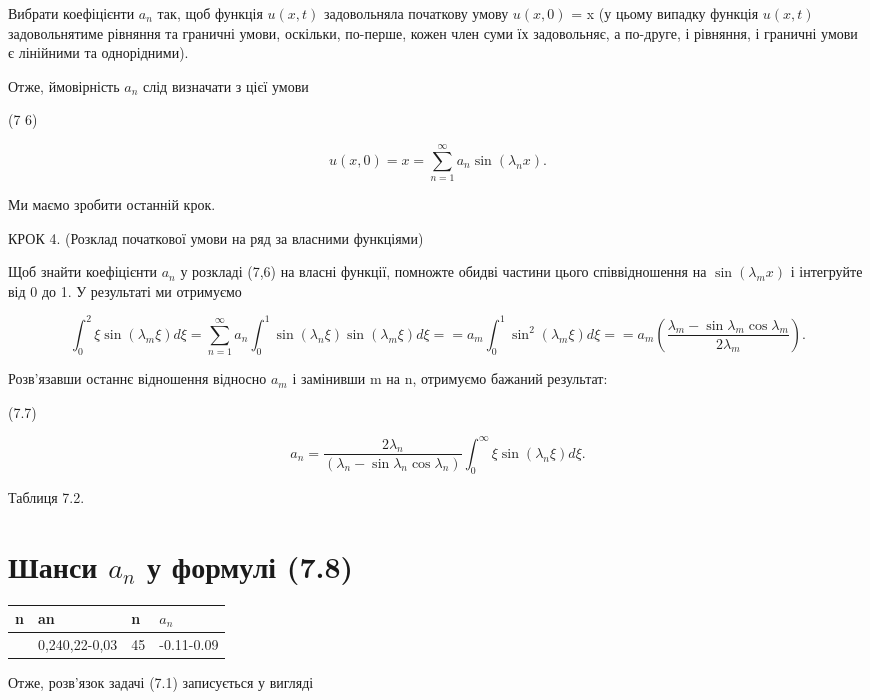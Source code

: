 \documentclass[
  ukrainian,
]{article}
\newcounter{none} %
\begin{document}
Вибрати коефіцієнти \(a_n\) так, щоб функція \(u(x, t)\) задовольняла
початкову умову \(u(x, 0)\) = x (у цьому випадку функція \(u(x, t)\)
задовольнятиме рівняння та граничні умови, оскільки, по-перше, кожен
член суми їх задовольняє, а по-друге, і рівняння, і граничні умови є
лінійними та однорідними).

Отже, ймовірність \(a_n\) слід визначати з цієї умови

(7 6)

\[
u(x, 0) = x = \sum_{n=1}^{\infty} a_n \sin(\lambda_n x).
\]

Ми маємо зробити останній крок.

КРОК 4. (Розклад початкової умови на ряд за власними функціями)

Щоб знайти коефіцієнти \(a_n\) у розкладі (7,6) на власні функції,
помножте обидві частини цього співвідношення на \(\sin(\lambda_m x)\) і
інтегруйте від 0 до 1. У результаті ми отримуємо

\[
\int_{0}^{2} \xi \sin(\lambda_{m} \xi) d\xi = \sum_{n=1}^{\infty} a_{n} \int_{0}^{1} \sin(\lambda_{n} \xi) \sin(\lambda_{m} \xi) d\xi =
= a_{m} \int_{0}^{1} \sin^{2}(\lambda_{m} \xi) d\xi =
= a_{m} \left( \frac{\lambda_{m} - \sin \lambda_{m} \cos \lambda_{m}}{2\lambda_{m}} \right).
\]

Розв'язавши останнє відношення відносно \(a_m\) і замінивши m на n,
отримуємо бажаний результат:

(7.7)

\[
a_n = \frac{2\lambda_n}{(\lambda_n - \sin \lambda_n \cos \lambda_n)} \int_0^{\infty} \xi \sin (\lambda_n \xi) d\xi.
\]

Таблиця 7.2.

\section{\texorpdfstring{Шанси \(a_n\) у формулі
(7.8)}{Шанси a\_n у формулі (7.8)}}\label{ux448ux430ux43dux441ux438-a_n-ux443-ux444ux43eux440ux43cux443ux43bux456-7.8}

{\def\LTcaptype{none} %
\begin{longtable}[]{@{}llll@{}}
\toprule\noalign{}
n & an & n & \(a_n\) \\
\midrule\noalign{}
\endhead
\bottomrule\noalign{}
\endlastfoot
123 & 0,240,22-0,03 & 45 & -0.11-0.09  \\
\end{longtable}
}

Отже, розв'язок задачі (7.1) записується у вигляді
\end{document}
